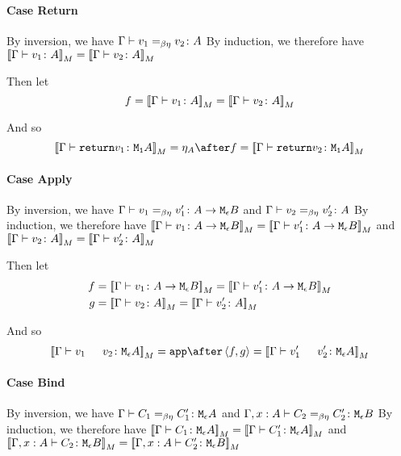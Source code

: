 {    \paragraph{Case Return}
    By inversion, we have $\Gamma \vdash v_1 =_{\beta\eta} v_2 \colon A$
    By induction, we therefore have ${\bf [\![}\Gamma \vdash v_1 \colon A{\bf ]\!]}_M = {\bf [\![}\Gamma \vdash v_2 \colon A{\bf ]\!]}_M$

    Then let
    \begin{equation}
        f = {\bf [\![}\Gamma \vdash v_1 \colon A{\bf ]\!]}_M = {\bf [\![}\Gamma \vdash v_2 \colon A{\bf ]\!]}_M
    \end{equation}

    And so
    \begin{equation}
        \deno{\gtyperelation{\return{v_1}}{\M{\1}{A}}} = \point{A}\after f = \deno{\gtyperelation{\return{v_2}}{\M{\1}{A}}}
    \end{equation}


    \paragraph{Case Apply}
    By inversion, we have $\Gamma \vdash v_1 =_{\beta\eta} v_1' \colon A \rightarrow \texttt{M}_{\epsilon}{B}$ and $\Gamma \vdash v_2 =_{\beta\eta} v_2' \colon A$
    By induction, we therefore have ${\bf [\![}\Gamma \vdash v_1 \colon A \rightarrow \texttt{M}_{\epsilon}{B}{\bf ]\!]}_M= {\bf [\![}\Gamma \vdash v_1' \colon A \rightarrow \texttt{M}_{\epsilon}{B}{\bf ]\!]}_M$ and ${\bf [\![}\Gamma \vdash v_2 \colon A{\bf ]\!]}_M = {\bf [\![}\Gamma \vdash v_2' \colon A{\bf ]\!]}_M$

    Then let
    \begin{align}
        f &{}= \deno{\gtyperelation{v_1}{\aeb}} = \deno{\gtyperelation{v_1'}{\aeb}}\\
        g &{}= \deno{\gtyperelation{v_2}{A}} = \deno{\gtyperelation{v_2'}{A}}
    \end{align}



    And so
    \begin{equation}
        \deno{\gtyperelation{\apply{v_1}{v_2}}{\M{\e}{A}}} = \app\after\pr{f}{g} = \deno{\gtyperelation{\apply{v_1'}{v_2'}}{\M{\e}{A}}}
    \end{equation}


    \paragraph{Case Bind}
    By inversion, we have $\Gamma \vdash C_1 =_{\beta\eta} C_1' \colon \texttt{M}_{\epsilon}{A}$ and $\Gamma, x: A \vdash C_2 =_{\beta\eta} C_2' \colon \texttt{M}_{\epsilon}{B}$
    By induction, we therefore have ${\bf [\![}\Gamma \vdash C_1 \colon \texttt{M}_{\epsilon}{A}{\bf ]\!]}_M= {\bf [\![}\Gamma \vdash C_1' \colon \texttt{M}_{\epsilon}{A}{\bf ]\!]}_M$ and ${\bf [\![}\Gamma, x: A \vdash C_2 \colon \texttt{M}_{\epsilon}{B}{\bf ]\!]}_M = {\bf [\![}\Gamma, x: A \vdash C_2' \colon \texttt{M}_{\epsilon}{B}{\bf ]\!]}_M$

}
